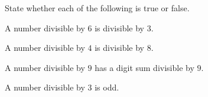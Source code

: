  State whether each of the following is true or false.

\begin{subparts}
  \item A number divisible by $6$ is divisible by $3$.
  \item A number divisible by $4$ is divisible by $8$.
  \item A number divisible by $9$ has a digit sum divisible by $9$.
  \item A number divisible by $3$ is odd.
\end{subparts}

